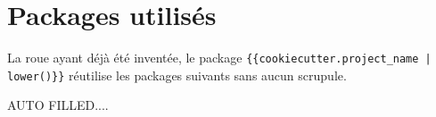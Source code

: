 \documentclass[12pt,a4paper]{article}
\begin{document}
\section{Packages utilisés}

La roue ayant déjà été inventée, le package \verb#{{cookiecutter.project_name | lower()}}# réutilise les packages suivants sans aucun scrupule.

\begin{multicols}{2}
AUTO FILLED....
\end{multicols}
\end{document}
